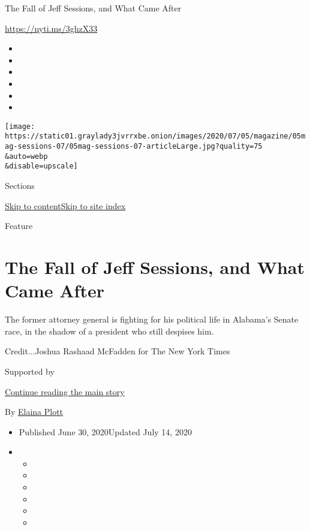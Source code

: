The Fall of Jeff Sessions, and What Came After

\url{https://nyti.ms/3ghzX33}

\begin{itemize}
\item
\item
\item
\item
\item
\item
\end{itemize}

\texttt{[image: https://static01.graylady3jvrrxbe.onion/images/2020/07/05/magazine/05mag-sessions-07/05mag-sessions-07-articleLarge.jpg?quality=75\\\&auto=webp\\\&disable=upscale]}

Sections

\protect\hyperlink{site-content}{Skip to
content}\protect\hyperlink{site-index}{Skip to site index}

Feature

\hypertarget{the-fall-of-jeff-sessions-and-what-came-after}{%
\section{The Fall of Jeff Sessions, and What Came
After}\label{the-fall-of-jeff-sessions-and-what-came-after}}

The former attorney general is fighting for his political life in
Alabama's Senate race, in the shadow of a president who still despises
him.

Credit...Joshua Rashaad McFadden for The New York Times

Supported by

\protect\hyperlink{after-sponsor}{Continue reading the main story}

By \href{https://www.nytimes3xbfgragh.onion/by/elaina-plott}{Elaina
Plott}

\begin{itemize}
\item
  Published June 30, 2020Updated July 14, 2020
\item
  \begin{itemize}
  \item
  \item
  \item
  \item
  \item
  \item
  \end{itemize}
\end{itemize}

